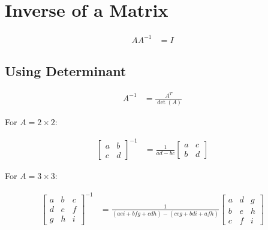 \section{Inverse of a Matrix}
	\begin{align}
		AA^{-1} &= I&
	\end{align}

	\subsection{Using Determinant}
		\begin{align}
			A^{-1} &= \frac{A^{T}}{\det{(A)}}&
		\end{align}

		For $A = 2 \times 2$:

		\begin{align}
			\begin{bmatrix}
				a & b \\
				c & d
			\end{bmatrix}^{-1} &= \frac{1}{ad - bc}
			\begin{bmatrix}
				a & c \\
				b & d
			\end{bmatrix}&
		\end{align}

		For $A = 3 \times 3$:

		\begin{align}
			\begin{bmatrix}
				a & b & c \\
				d & e & f \\
				g & h & i
			\end{bmatrix}^{-1} &= \frac{1}{(aei + bfg + cdh) - (ceg + bdi + afh)}
			\begin{bmatrix}
				a & d & g \\
				b & e & h \\
				c & f & i
			\end{bmatrix}&
		\end{align}
